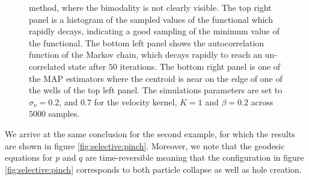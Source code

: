 \documentclass[runningheads]{llncs}
\begin{document}
\begin{figure}[h!]
{    method, where the bimodality is not clearly visible. 
    The top right panel is a histogram of the sampled values of the
    functional which rapidly decays, indicating a good sampling of the minimum value 
    of the functional. 
    The bottom left panel shows the autocorrelation function of the
    Markov chain, which decays rapidly to reach an un-correlated state after $50$ iterations. 
    The bottom right panel is one of the MAP estimators where the centroid is near on the edge of 
    one of the wells of the top left panel.
    The simulations parameters are set to
    $\sigma_\nu = 0.2$, and $0.7$ for the velocity kernel, $K=1$ and $\beta=0.2$
    across $5000$ samples.}
    \label{fig:selective:crisscross}
\end{figure}

We arrive at the same conclusion for the second example, for which the results
are shown in figure \eqref{fig:selective:pinch}. Moreover, we note that the
geodesic equations for $p$ and $q$ are time-reversible meaning that the
configuration in figure \ref{fig:selective:pinch} corresponds to both particle
collapse as well as hole creation. 
\end{document}
